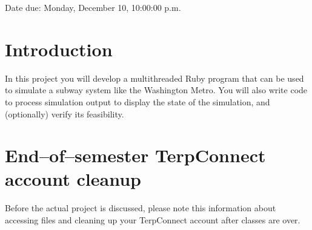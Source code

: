 \documentclass[11pt]{article}
\begin{document}

  \vspace{-3mm}

  \begin{centering}

    Date due: Monday, December 10, 10:00:00 p.m.

  \end{centering}

  \vspace{-6mm}


  \section{Introduction}

    In this project you will develop a multithreaded Ruby program that can be
  used to simulate a subway system like the Washington Metro.  You will also
  write code to process simulation output to display the state of the
  simulation, and (optionally) verify its feasibility.

  \section{End--of--semester TerpConnect account cleanup}

    Before the actual project is discussed, please note this information about
  accessing files and cleaning up your TerpConnect account after classes are
  over.
\end{document}
